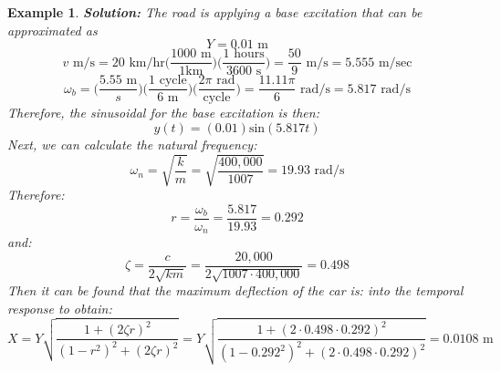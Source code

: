 \documentclass[12pt,letter]{article}
\newtheorem{ex}{Example}
\numberwithin{ex}{section} %
\newenvironment{example}{\begin{mdframed}[middlelinewidth=0.5mm]\begin{ex}\normalfont}{\end{ex}\end{mdframed}}
\numberwithin{re}{section} %
\begin{document}
\begin{example}
			\noindent\textbf{Solution:} The road is applying a base excitation that can be approximated as 
			\begin{equation}
				Y = 0.01 \text{ m}
			\end{equation} 				
			\begin{equation}
				v \text{ m/s} = 20 \text{ km/hr}\Bigg(\frac{1000 \text{ m}}{1 \text {km}}\Bigg) \Bigg(\frac{1 \text{ hours}}{3600 \text { s}}\Bigg) = \frac{50}{9} \text{ m/s} = 5.555 \text{ m/sec}
			\end{equation} 	
			\begin{equation}
				\omega_b = \Bigg(\frac{ 5.55 \text{ m}}{s}\Bigg) \Bigg(\frac{ 1 \text{ cycle}}{6 \text{ m}}\Bigg) \Bigg(\frac{ 2 \pi \text{ rad}}{\text {cycle}}\Bigg) = \frac{ 11.11 \pi }{6 } \text{ rad/s} =5.817 \text{ rad/s} 
			\end{equation} 	
			Therefore, the sinusoidal for the base excitation is then:
			\begin{equation}
				y(t) = (0.01) \text{sin}(5.817 t)
			\end{equation} 	
			Next, we can calculate the natural frequency:
			\begin{equation}
				\omega_n = \sqrt{\frac{k}{m}} = \sqrt{\frac{400,000}{1007}} = 19.93 \text{ rad/s}
			\end{equation} 			
			Therefore:
			\begin{equation}
			r=\frac{\omega_b}{\omega_n} = \frac{5.817}{19.93} =0.292
			\end{equation} 		
			and:
			\begin{equation}
			\zeta = \frac{c}{2\sqrt{km}}= \frac{20,000}{2\sqrt{1007\cdot400,000}} = 0.498
			\end{equation}	
			Then it can be found that the maximum deflection of the car is:
			into the temporal response to obtain:
			\begin{equation}
			X = Y \sqrt{\frac{1+(2 \zeta r)^2}{(1-r^2)^2 + (2 \zeta r )^2}} = Y \sqrt{\frac{1+(2 \cdot 0.498 \cdot 0.292)^2}{(1-0.292^2)^2 + (2 \cdot 0.498 \cdot 0.292 )^2}}  = 0.0108 \text{ m}
			\end{equation} 		
\end{example}				
			
\end{document}
